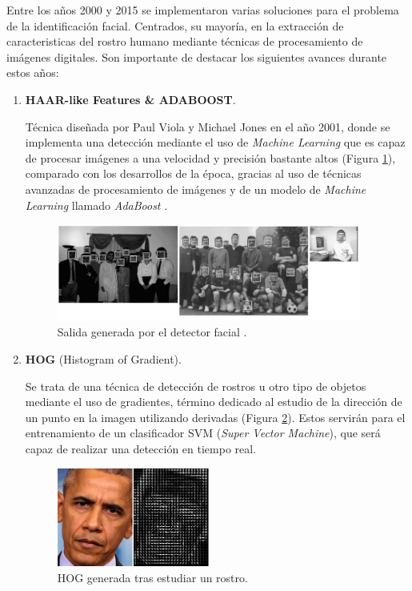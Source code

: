 Entre los años 2000 y 2015 se implementaron varias soluciones para el problema de la identificación facial. Centrados, su mayoría, en la extracción de caracteristicas del rostro humano mediante técnicas de procesamiento de imágenes digitales. Son importante de destacar los siguientes avances durante estos años:

\begin{enumerate}
	\item \textbf{HAAR-like Features \& ADABOOST}.
	
	Técnica diseñada por Paul Viola y Michael Jones en el año 2001, donde se implementa una detección mediante el uso de \textit{Machine Learning} que es capaz de procesar imágenes a una velocidad y precisión bastante altos (Figura \ref{fig:haarExample}), comparado con los desarrollos de la época, gracias al uso de técnicas avanzadas de procesamiento de imágenes y de un modelo de \textit{Machine Learning} llamado \textit{AdaBoost} \cite{paulViola}. 
	
	\begin{figure}[htp]
		\centering
		\includegraphics[width=10cm]{imagenes/violayjones_detector.png}
		\caption{Salida generada por el detector facial \cite{paulViola}.}
		\label{fig:haarExample}
	\end{figure}
	
	\item \textbf{HOG} (Histogram of Gradient).
	
	Se trata de una técnica de detección de rostros u otro tipo de objetos mediante el uso de gradientes, término dedicado al estudio de la dirección de un punto en la imagen utilizando derivadas (Figura \ref{fig:hogExample}). Estos servirán para el entrenamiento de un clasificador SVM (\textit{Super Vector Machine}), que será capaz de realizar una detección en tiempo real.
	
	\begin{figure}[htp]
		\centering
		\includegraphics[width=5cm]{imagenes/hog_example.png}
		\caption{HOG generada tras estudiar un rostro.}
		\label{fig:hogExample}
	\end{figure}
	

\end{enumerate}
